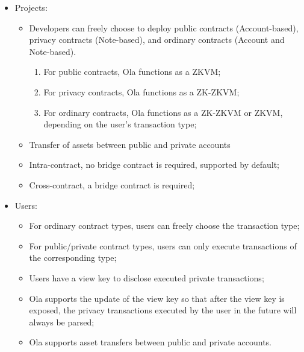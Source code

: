 \begin{itemize}
\item Projects:
    \begin{itemize}
    \item Developers can freely choose to deploy public contracts (Account-based), privacy contracts (Note-based), and ordinary contracts (Account and Note-based).
        \begin{enumerate}
        \item For public contracts, Ola functions as a ZKVM;
        \item For privacy contracts, Ola functions as a ZK-ZKVM;
        \item For ordinary contracts, Ola functions as a ZK-ZKVM or ZKVM, depending on the user's transaction type;
        \end{enumerate}
    \item Transfer of assets between public and private accounts
    \item Intra-contract, no bridge contract is required, supported by default;
    \item Cross-contract, a bridge contract is required;
    \end{itemize}
\item Users:
    \begin{itemize}
    \item For ordinary contract types, users can freely choose the transaction type;
    \item For public/private contract types, users can only execute transactions of the corresponding type;
    \item Users have a view key to disclose executed private transactions;
    \item Ola supports the update of the view key so that after the view key is exposed, the privacy transactions executed by the user in the future will always be parsed;
    \item Ola supports asset transfers between public and private accounts.
    \end{itemize}
\end{itemize}
